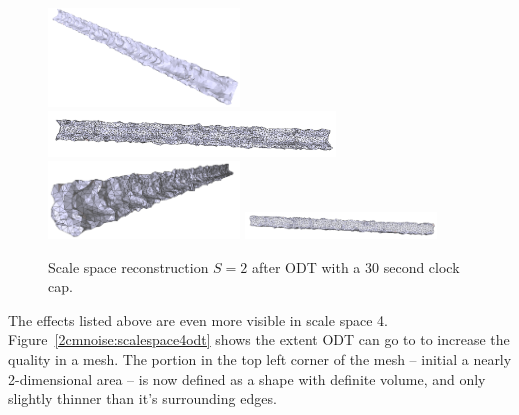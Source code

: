 \documentclass[12pt]{drexelthesis}
\begin{document}
\begin{figure}[!ht]
	
	\centering
		\includegraphics[width=2in]{simulated-lab-scan/2cmnoise/optimized/scalespace2odt00.png}
		\includegraphics[width=3in]{simulated-lab-scan/2cmnoise/optimized/scalespace2odt01.png}
		\includegraphics[width=2in]{simulated-lab-scan/2cmnoise/optimized/scalespace2odt02.png}
		\includegraphics[width=2in]{simulated-lab-scan/2cmnoise/optimized/scalespace2odt03.png}
		\caption[Scale space reconstruction $S = 2$ after ODT with a 30 second clock cap]{\centering Scale space reconstruction $S = 2$ after ODT with a 30 second clock cap.}
	\label{2cmnoise:scalespace2odt}
\end{figure}

The effects listed above are even more visible in scale space 4. Figure~\ref{2cmnoise:scalespace4odt} shows the extent ODT can go to to increase the quality in a mesh. The portion in the top left corner of the mesh -- initial a nearly 2-dimensional area -- is now defined as a shape with definite volume, and only slightly thinner than it's surrounding edges.
\end{document}
